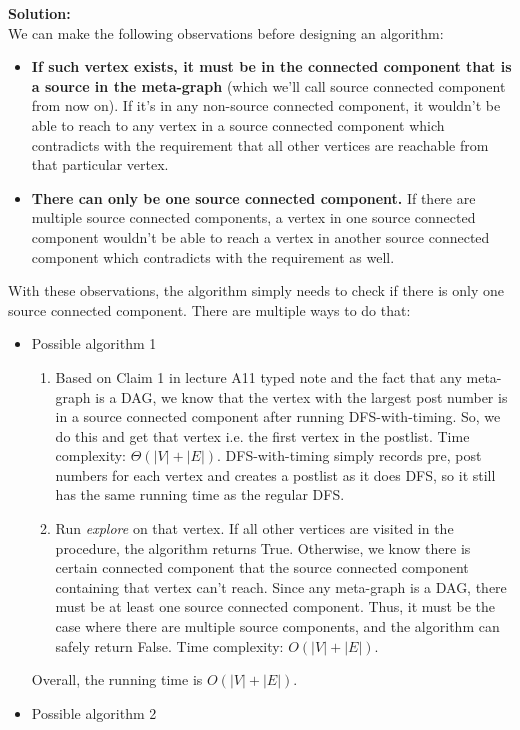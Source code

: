 \documentclass[11pt]{article}
\begin{document}
\begin{qunlist}
\textbf{Solution: }\\
We can make the following observations before designing an algorithm:
\begin{itemize}
    \item \textbf{If such vertex exists, it must be in the connected component that is a source in the meta-graph} (which we'll call source connected component from now on). If it's in any non-source connected component, it wouldn't be able to reach to any vertex in a source connected component which contradicts with the requirement that all other vertices are reachable from that particular vertex.
    \item \textbf{There can only be one source connected component.} If there are multiple source connected components, a vertex in one source connected component wouldn't be able to reach a vertex in another source connected component which contradicts with the requirement as well.
\end{itemize}
With these observations, the algorithm simply needs to check if there is only one source connected component. There are multiple ways to do that:
\begin{itemize}
    \item Possible algorithm 1
    \begin{enumerate}
        \item Based on Claim 1 in lecture A11 typed note and the fact that any meta-graph is a DAG, we know that the vertex with the largest post number is in a source connected component after running DFS-with-timing. So, we do this and get that vertex i.e. the first vertex in the postlist. Time complexity: $\Theta(|V| + |E|)$. DFS-with-timing simply records pre, post numbers for each vertex and creates a postlist as it does DFS, so it still has the same running time as the regular DFS.
        \item Run \emph{explore} on that vertex. If all other vertices are visited in the procedure, the algorithm returns True. Otherwise, we know there is certain connected component that the source connected component containing that vertex can't reach. Since any meta-graph is a DAG, there must be at least one source connected component. Thus, it must be the case where there are multiple source components, and the algorithm can safely return False. Time complexity: $O(|V| + |E|)$.
    \end{enumerate}
    Overall, the running time is $O(|V| + |E|)$.
    \item Possible algorithm 2
    \begin{enumerate}

\end{enumerate}
\end{itemize}
\end{qunlist}
\end{document}
